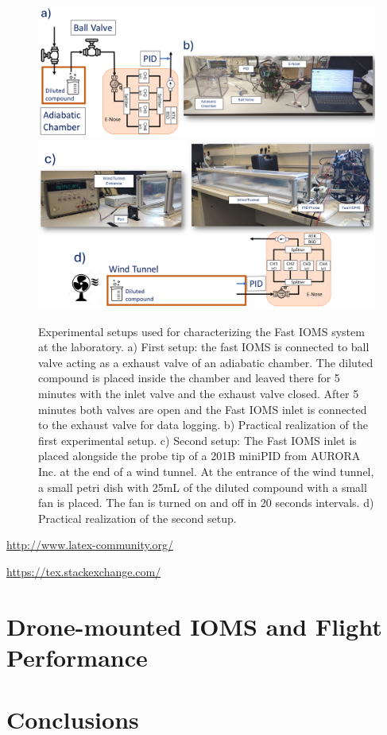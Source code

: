 \documentclass[lettersize,journal]{IEEEtran}
\begin{document}
\begin{figure}[t] %
	\centering
	\includegraphics[width=0.53\linewidth]{./images/fig2_ab.png}
	\hfill
	\includegraphics[width=0.45\linewidth]{./images/fig2_cd.png}
	\hfill
	\caption{Experimental setups used for characterizing the Fast IOMS system at the laboratory. a) First setup: the fast IOMS is connected to ball valve acting as a exhaust valve of an adiabatic chamber. The diluted compound is placed inside the chamber and leaved there for 5 minutes with the inlet valve and the exhaust valve closed. After 5 minutes both valves are open and the Fast IOMS inlet is connected to the exhaust valve for data logging. b) Practical realization of the first experimental setup. c) Second setup: The Fast IOMS inlet is placed alongside the probe tip of a 201B miniPID from AURORA Inc. at the end of a wind tunnel. At the entrance of the wind tunnel, a small petri dish with 25mL of the diluted compound with a small fan is placed. The fan is turned on and off in 20 seconds intervals. d) Practical realization of the second setup.}
	\label{fig:characSetups}
\end{figure}

\begin{list}{}{}
\item{\url{http://www.latex-community.org/}} 
\item{\url{https://tex.stackexchange.com/} }
\end{list}

\section{Drone-mounted IOMS and Flight Performance}
\label{sec:flyPerf}


\section{Conclusions}
\label{sec:conclusions}
\end{document}
